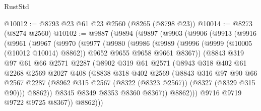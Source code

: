 \begin{lexlean}{RustStd}
\begin{coremodule}
{\begin{coremodule}
{{{{{{{{{{{{{{{{{{{{{{{{{{{{{{{{{{{{{{{{{{{{{{{{{{{{{{@10012 := @8793 @23 @61 @23 @2560 (@8265 (@8798 @23))
@10014 := @8273 (@8274 @2560)
@10102 := @9887
    (@9894
      (@9897
        (@9903
          (@9906
            (@9913
              (@9916
                (@9961
                  (@9967
                    (@9970
                      (@9977
                        (@9980
                          (@9986
                            (@9989
                              (@9996
                                (@9999 (@10005 (@10012 @10014) @8862))
                                @9652
                                @9655
                                @9658
                                @9661
                                @8367))
                            (@8843
                              @319
                              @97
                              @61
                              @66
                              @2571
                              @2287
                              (@8902
                                @319
                                @61
                                @2571
                                (@8943
                                  @318
                                  @402
                                  @61
                                  @2268
                                  @2569
                                  @2027
                                  @408
                                  (@8838
                                    @318
                                    @402
                                    @2569
                                    (@8843
                                      @316
                                      @97
                                      @90
                                      @66
                                      @2567
                                      @2287
                                      (@8962
                                        @315
                                        @2567
                                        (@8322 (@8323 @2567))
                                        (@8327 (@8329 @315 @90)))
                                      @8862))
                                  @8345
                                  @8349
                                  @8353
                                  @8360
                                  @8367))
                              @8862)))
                        @9716
                        @9719
                        @9722
                        @9725
                        @8367))
                    @8862)))
}}}}}}}}}}}}}}}}}}}}}}}}}}}}}}}}}}}}}}}}}}}}}}}}}}}}}}
\end{coremodule}}
\end{coremodule}
\end{lexlean}
